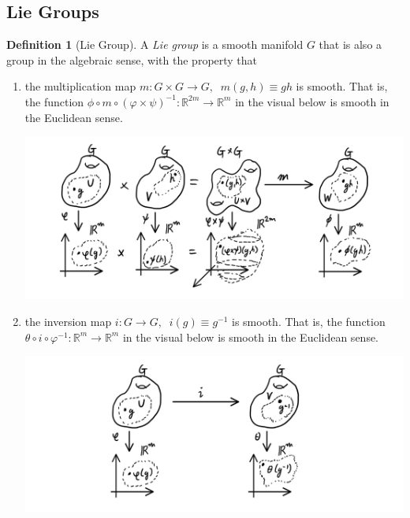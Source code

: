 \documentclass{article}
\theoremstyle{remark}
\theoremstyle{definition}
\newtheorem{definition}{Definition}[section]
\begin{document}
\subsection{Lie Groups}
\begin{definition}[Lie Group]
A \textit{Lie group} is a smooth manifold $G$ that is also a group in the algebraic sense, with the property that 
\begin{enumerate}
    \item the multiplication map $m: G \times G \longrightarrow G, \;\; m(g, h) \equiv g h$ is smooth. That is, the function $\phi \circ m \circ (\varphi \times \psi)^{-1}: \mathbb{R}^{2m} \longrightarrow \mathbb{R}^m$ in the visual below is smooth in the Euclidean sense.  
    \begin{center}
        \includegraphics[scale=0.28]{img/Lie_Group_Multiplication.PNG}
    \end{center}
    \item the inversion map $i: G \longrightarrow G, \;\; i(g) \equiv g^{-1}$ is smooth. That is, the function $\theta \circ i \circ \varphi^{-1}: \mathbb{R}^m \longrightarrow \mathbb{R}^m$ in the visual below is smooth in the Euclidean sense.  
    \begin{center}
        \includegraphics[scale=0.29]{img/Lie_Group_Inversion.PNG}
    \end{center}
\end{enumerate}
\end{definition}
\end{document}
